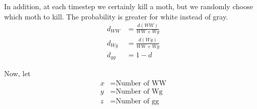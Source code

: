 \documentclass[leqno]{article}
\begin{document}
In addition, at each timestep we certainly kill a moth, but we randomly choose which moth to kill. The probability is greater for white instead of gray.
\begin{align*}
d_{WW} &= \frac{d(WW)}{WW+Wg}\\
d_{Wg} &= \frac{d(Wg)}{WW+Wg}\\
d_{gg} &= 1-d
\end{align*}

Now, let
\begin{align*}
x &= \text{Number of WW}\\
y &= \text{Number of Wg}\\
z &= \text{Number of gg}
\end{align*}

\end{document}
